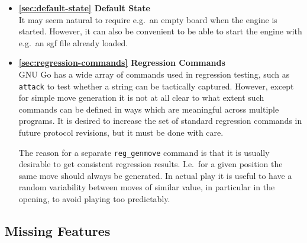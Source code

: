 \documentclass[a4paper]{article}
\begin{document}
\begin{itemize}
\item \textbf{\ref{sec:default-state} Default State} \\
  It may seem natural to require e.g.\ an empty board when the engine
  is started. However, it can also be convenient to be able to start
  the engine with e.g.\ an sgf file already loaded.

\item \textbf{\ref{sec:regression-commands} Regression Commands} \\
  GNU Go has a wide array of commands used in regression testing, such
  as \texttt{attack} to test whether a string can be tactically
  captured. However, except for simple move generation it is not at
  all clear to what extent such commands can be defined in ways which
  are meaningful across multiple programs. It is desired to increase
  the set of standard regression commands in future protocol
  revisions, but it must be done with care.
  
  The reason for a separate \texttt{reg\_genmove} command is that it is
  usually desirable to get consistent regression results. I.e.\ for a
  given position the same move should always be generated. In actual
  play it is useful to have a random variability between moves of
  similar value, in particular in the opening, to avoid playing too
  predictably.

\end{itemize}

\subsection{Missing Features}
\label{sec:missing-features}
\end{document}
